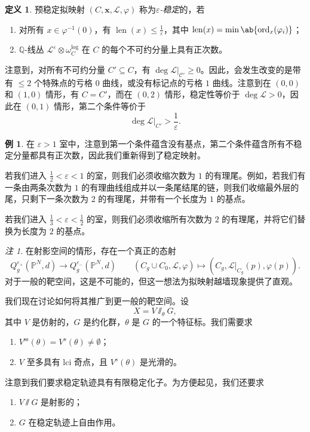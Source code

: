 \documentclass{amsart}
\theoremstyle{definition}
\newtheorem{defn}[thm]{定义}
\newtheorem{exm}[thm]{例}
\theoremstyle{remark}
\newtheorem{rmk}[thm]{注}
\theoremstyle{plain}
\theoremstyle{definition}
\theoremstyle{remark}
\newcommand{\Q}{\mathbb{Q}}
\renewcommand{\P}{\mathbb{P}}
\newcommand{\ep}{\varepsilon}
\newcommand{\mc}[1]{\mathcal{#1}}
\newcommand{\mr}[1]{\mathrm{#1}}
\newcommand{\on}[1]{\operatorname{#1}}
\newcommand{\1}{\mathbf{1}}
\newcommand{\2}{\mathbf{2}}
\newcommand{\3}{\mathbf{3}}
\begin{document}
\begin{defn}
    预稳定拟映射 \((C, \mathbf{x}, \mc{L}, \varphi)\) 称为\textit{\(\ep\)-稳定}的，若
    \begin{enumerate}
        \item 对所有 \(x \in \varphi^{-1}(0)\)，有 \(\on{len}(x) \leq \frac{1}{\ep}\)，其中 \(\on{len}(x) = \min \ab\{ \on{ord}_x (\varphi_i)\}\)；
        \item \(\Q\)-线丛 \(\mc{L}^{\ep} \otimes \omega_C^{\log}\) 在 \(C\) 的每个不可约分量上具有正次数。
    \end{enumerate}
\end{defn}

注意到，对所有不可约分量 \(C' \subseteq C\)，有 \(\deg \mc{L}|_{\mc{C}'} \geq 0\)。因此，会发生改变的是带有 \(\leq 2\) 个特殊点的亏格 \(0\) 曲线，或没有标记点的亏格 \(1\) 曲线。注意到在 \((0,0)\) 和 \((1,0)\) 情形，有 \(C = C'\)，而在 \((0,2)\) 情形，稳定性等价于 \(\deg \mc{L} > 0\)，因此在 \((0,1)\) 情形，第二个条件等价于
\[ \deg \mc{L}|_{C'} > \frac{1}{\ep}. \]

\begin{exm}
    在 \(\ep > 1\) 室中，注意到第一个条件蕴含没有基点，第二个条件蕴含所有不稳定分量都具有正次数，因此我们重新得到了稳定映射。

    若我们进入 \(\frac{1}{2} < \ep < 1\) 的室，则我们必须收缩次数为 \(1\) 的有理尾。例如，若我们有一条由两条次数为 \(1\) 的有理曲线组成并以一条尾结尾的链，则我们收缩最外层的尾，只剩下一条次数为 \(2\) 的有理尾，并带有一个长度为 \(1\) 的基点。

    若我们进入 \(\frac{1}{3} < \ep < \frac{1}{2}\) 的室，则我们必须收缩所有次数为 \(2\) 的有理尾，并将它们替换为长度为 \(2\) 的基点。
\end{exm}

\begin{rmk}
    在射影空间的情形，存在一个真正的态射
    \[ Q_g^{\ep_+}(\P^N, d) \to Q_g^{\ep_-}(\P^N, d) \qquad (C_g \cup C_0, \mc{L}, \varphi) \mapsto (C_g, \mc{L}|_{C_g}(p), \varphi(p)). \]
    对于一般的靶空间，这是不可能的，但这一想法为拟映射越墙现象提供了直观。
\end{rmk}

我们现在讨论如何将其推广到更一般的靶空间。设
\[ X = V \sslash_{\theta} G, \]
其中 \(V\) 是仿射的，\(G\) 是约化群，\(\theta\) 是 \(G\) 的一个特征标。我们需要求
\begin{enumerate}
    \item \(V^{\mr{ss}}(\theta) = V^s(\theta) \neq \emptyset\)；
    \item \(V\) 至多具有 lci 奇点，且 \(V^s(\theta)\) 是光滑的。
\end{enumerate}
注意到我们要求稳定轨迹具有有限稳定化子。为方便起见，我们还要求
\begin{enumerate}
    \item \(V \sslash G\) 是射影的；
    \item \(G\) 在稳定轨迹上自由作用。
\end{enumerate}
\end{document}
